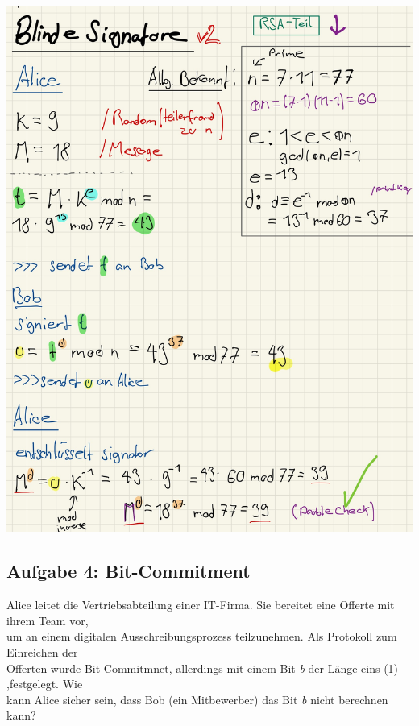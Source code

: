 \documentclass[11pt]{article}
\begin{document}
\begin{center}
	\includegraphics[scale=0.85]{img/blindsig2.jpg}
\end{center}

    \hypertarget{aufgabe-4-bit-commitment}{%
\subsection{Aufgabe 4: Bit-Commitment}\label{aufgabe-4-bit-commitment}}

Alice leitet die Vertriebsabteilung einer IT-Firma. Sie bereitet eine
Offerte mit ihrem Team vor,\\
um an einem digitalen Ausschreibungsprozess teilzunehmen. Als Protokoll
zum Einreichen der\\
Offerten wurde Bit-Commitmnet, allerdings mit einem Bit \emph{b} der
Länge eins (1) ,festgelegt. Wie\\
kann Alice sicher sein, dass Bob (ein Mitbewerber) das Bit \emph{b}
nicht berechnen kann?
\end{document}
